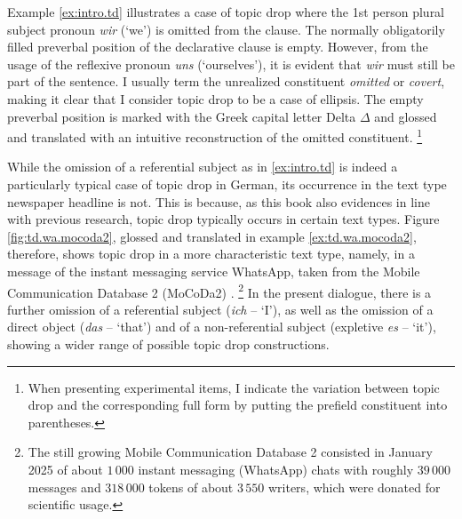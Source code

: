 Example \ref{ex:intro.td} illustrates a case of topic drop where the 1st person plural subject pronoun \textit{wir} (`we') is omitted from the clause.
The normally obligatorily filled preverbal position of the declarative clause is empty.
However, from the usage of the reflexive pronoun \textit{uns} (`ourselves'), it is evident that \textit{wir} must still be part of the sentence.
I usually term the unrealized constituent \textit{omitted} or \textit{covert}, making it clear that I consider topic drop to be a case of ellipsis.
The empty preverbal position is marked with the Greek capital letter Delta $\Delta$ and glossed and translated with an intuitive reconstruction of the omitted constituent.%
\footnote{When presenting experimental items, I indicate the variation between topic drop and the corresponding full form by putting the prefield constituent into parentheses.}
%

\largerpage
While the omission of a referential subject as in \ref{ex:intro.td} is indeed a particularly typical case of topic drop in German, its occurrence in the text type newspaper headline is not.
This is because, as this book also evidences in line with previous research, topic drop typically occurs in certain text types. 
Figure \ref{fig:td.wa.mocoda2}, glossed and translated in example \ref{ex:td.wa.mocoda2}, therefore, shows topic drop in a more characteristic text type, namely, in a message of the instant messaging service WhatsApp, taken from the Mobile Communication Database 2 (MoCoDa2) \citep{beisswenger.etal2020}.%
\footnote{The still growing Mobile Communication Database 2 consisted in January 2025 of about $1\,000$ instant messaging (WhatsApp) chats with roughly $39\,000$ messages and $318\,000$ tokens of about $3\,550$ writers, which were donated for scientific usage.}
%
In the present dialogue, there is a further omission of a referential subject (\textit{ich} -- `I'), as well as the omission of a direct object (\textit{das} -- `that') and of a non-referential subject (expletive  \textit{es} -- `it'), showing a wider range of possible topic drop constructions.

